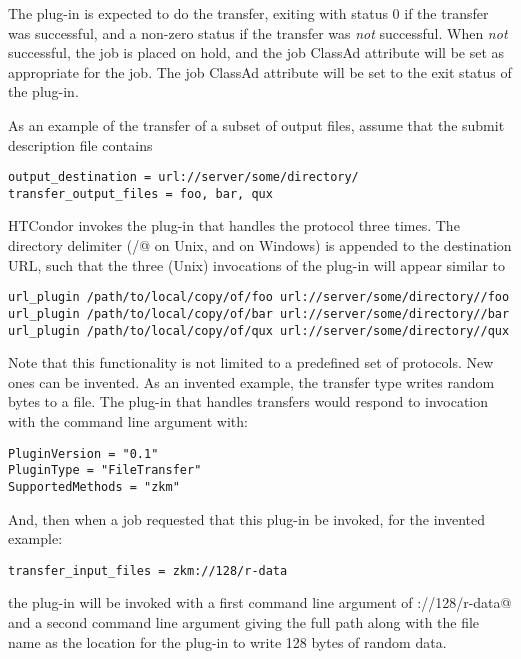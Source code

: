 The plug-in is expected to do the transfer,
exiting with status 0 if the transfer was successful, 
and a non-zero status if the transfer was \emph{not} successful.
When \emph{not} successful, the job is placed on hold,
and the job ClassAd attribute  will be set as
appropriate for the job.
The job ClassAd attribute  will be set to
the exit status of the plug-in.

As an example of the transfer of a subset of output files,
assume that the submit description file contains 
\footnotesize
\begin{verbatim}
output_destination = url://server/some/directory/
transfer_output_files = foo, bar, qux
\end{verbatim}
\normalsize
HTCondor invokes the plug-in that handles the  protocol
three times.
The directory delimiter
(\verb@/@ on Unix, and \verb@\@ on Windows) 
is appended to the destination URL,
such that the three (Unix) invocations of the plug-in will appear similar to
\footnotesize
\begin{verbatim}
url_plugin /path/to/local/copy/of/foo url://server/some/directory//foo
url_plugin /path/to/local/copy/of/bar url://server/some/directory//bar
url_plugin /path/to/local/copy/of/qux url://server/some/directory//qux
\end{verbatim}
\normalsize

Note that this functionality is not limited to a predefined set
of protocols.
New ones can be invented.
As an invented example,
the \verb@zkm@ transfer type writes random bytes to a file.
The plug-in that handles \verb@zkm@ transfers would respond to 
invocation with the  command line argument with:
\footnotesize
\begin{verbatim}
PluginVersion = "0.1"
PluginType = "FileTransfer"
SupportedMethods = "zkm"
\end{verbatim}
\normalsize
And, then when a job requested that this plug-in be invoked,
for the invented example:
\footnotesize
\begin{verbatim}
transfer_input_files = zkm://128/r-data
\end{verbatim}
\normalsize
the plug-in will be invoked with a first command line argument
of \verb@zkm://128/r-data@ and a second command line argument giving
the full path along with the file name  as the location
for the plug-in to write 128 bytes of random data.


